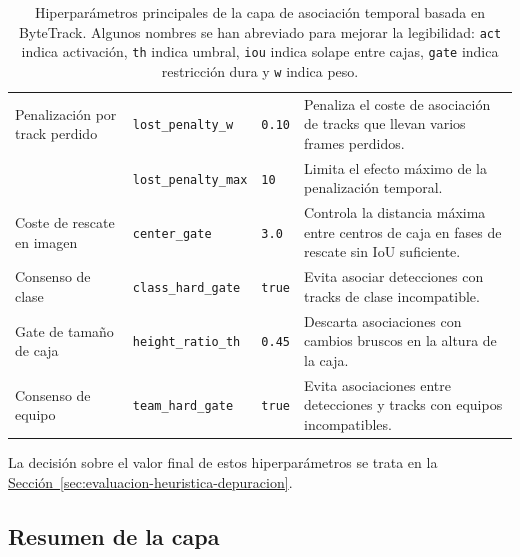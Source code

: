 \begin{table}[htbp]
\begin{tabularx}{\textwidth}{
>{\raggedright\arraybackslash}p{2.7cm}
>{\raggedright\arraybackslash}p{3.1cm}
>{\raggedright\arraybackslash}p{1.5cm}
>{\raggedright\arraybackslash}X
}
\midrule

Penalización por track perdido &
\texttt{lost\_penalty\_w} &
\texttt{0.10} &
Penaliza el coste de asociación de tracks que llevan varios frames perdidos. \\

&
\texttt{lost\_penalty\_max} &
\texttt{10} &
Limita el efecto máximo de la penalización temporal. \\

\midrule

Coste de rescate en imagen &
\texttt{center\_gate} &
\texttt{3.0} &
Controla la distancia máxima entre centros de caja en fases de rescate sin IoU suficiente. \\

\midrule

Consenso de clase &
\texttt{class\_hard\_gate} &
\texttt{true} &
Evita asociar detecciones con tracks de clase incompatible. \\

\midrule

Gate de tamaño de caja &
\texttt{height\_ratio\_th} &
\texttt{0.45} &
Descarta asociaciones con cambios bruscos en la altura de la caja. \\

\midrule

Consenso de equipo &
\texttt{team\_hard\_gate} &
\texttt{true} &
Evita asociaciones entre detecciones y tracks con equipos incompatibles. \\

\bottomrule
\end{tabularx}

\caption[Hiperparámetros de asociación temporal basada en ByteTrack]{
Hiperparámetros principales de la capa de asociación temporal basada en ByteTrack. Algunos nombres se han abreviado para mejorar la legibilidad: \texttt{act} indica activación, \texttt{th} indica umbral, \texttt{iou} indica solape entre cajas, \texttt{gate} indica restricción dura y \texttt{w} indica peso.
}
\label{tab:hiperparametros-bytetrack}
\end{table}


La decisión sobre el valor final de estos hiperparámetros se trata en la \hyperref[sec:evaluacion-heuristica-depuracion]{Sección~\ref*{sec:evaluacion-heuristica-depuracion}}.

\subsection{Resumen de la capa}

